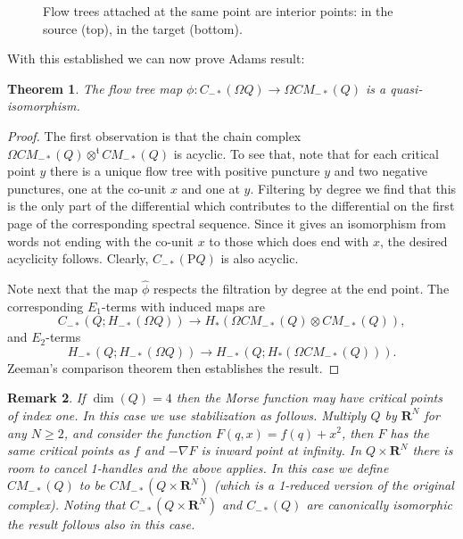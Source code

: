 \documentclass{gtpart}
\newtheorem{thm}{Theorem}
\newtheorem{rem}[thm]{Remark}
\renewcommand{\t}{\mathfrak{t}}
\renewcommand{\R}{\mathbf{R}}
\begin{document}
\begin{figure}[h!]
    \caption{Flow trees attached at the same point are interior points: in the source (top),
in the target (bottom). }\label{interiorpoints} \end{figure}




With this established we can now prove Adams result:
\begin{thm}\label{thm:Adams}
	The flow tree map $\phi\colon C_{-\ast}(\Omega Q)\to \Omega CM_{-\ast}(Q)$ is a quasi-isomorphism.
\end{thm}

\begin{proof} The first observation is that the chain complex $\Omega CM_{-\ast}(Q)\otimes^{\t}
    CM_{-\ast}(Q)$ is acyclic. To see that, note that for each critical point $y$ there is a unique
    flow tree with positive puncture $y$ and two negative punctures, one at the co-unit $x$ and one at $y$.
    Filtering by degree we find that this is the only part of the differential which contributes to
    the differential on the first page of the corresponding spectral sequence. Since it gives an isomorphism from words not ending with the co-unit $x$ to those which does end with
    $x$, the desired acyclicity follows. Clearly, $C_{-\ast}(\mathrm{P}Q)$ is also acyclic. 
	
    Note next that the map $\hat{\phi}$ respects the filtration by degree at the end point. The corresponding $E_{1}$-terms with induced maps are
	\[
        C_{-\ast}(Q;H_{-\ast}(\Omega Q))  \to H_{\ast}(\Omega CM_{-\ast}(Q)\otimes CM_{-\ast}(Q)),	\] 
	and $E_{2}$-terms
	\[
	H_{-\ast}(Q;H_{-\ast}(\Omega Q))  \to H_{-\ast}(Q;H_{\ast}(\Omega CM_{-\ast}(Q))).
	\] 
    Zeeman's comparison theorem \cite[Sec. 3.3]{McCleary} then establishes the result.
\end{proof}

\begin{rem}\label{r:dim4}
	If $\dim(Q)=4$ then the Morse function may have critical points of index one. In this case we
    use stabilization as follows. Multiply $Q$ by $\R^{N}$ for any $N \geq 2$, and consider the function $F(q,x)=f(q)+x^{2}$, then $F$ has the same critical points as $f$ and $-\nabla F$ is inward point at infinity.  In $Q\times \R^{N}$ there is room to cancel 1-handles and the above applies. In this case we define $CM_{-\ast}(Q)$ to be $CM_{-\ast}(Q\times \R^{N})$  (which is a 1-reduced version of the original complex). Noting that $C_{-\ast}(Q\times \R^{N})$ and $C_{-\ast}(Q)$ are canonically isomorphic the result follows also in this case.   
\end{rem}
\end{document}
